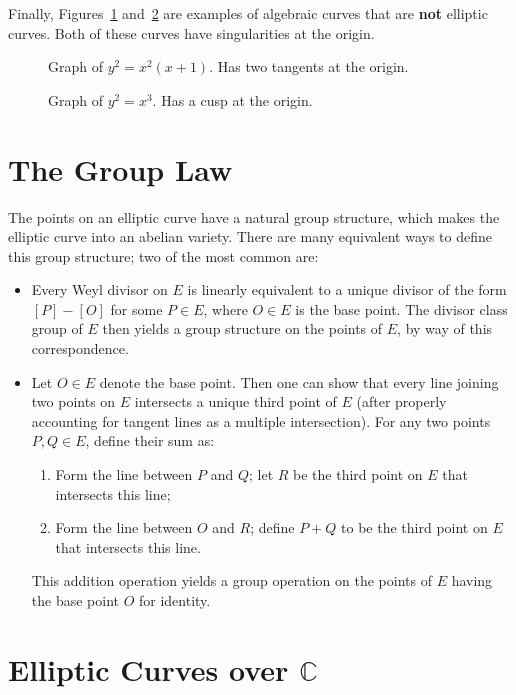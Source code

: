 \documentclass{article}
\theoremstyle{definition}
\begin{document}
Finally, Figures~\ref{001} and~\ref{000} are examples of algebraic curves that are {\bf not} elliptic curves. Both of these curves have singularities at the origin.
\begin{figure}
\caption{Graph of $y^2 = x^2 (x+1)$. Has two tangents at the origin.}
\label{001}
\end{figure}

\begin{figure}
\caption{Graph of $y^2 = x^3$. Has a cusp at the origin.}
\label{000}
\end{figure}

\section{The Group Law}

The points on an elliptic curve have a natural group structure, which makes the elliptic curve into an abelian variety. There are many equivalent ways to define this group structure; two of the most common are:
\begin{itemize}
\item Every Weyl divisor on $E$ is linearly equivalent to a unique divisor of the form $[P] - [O]$ for some $P \in E$, where $O \in E$ is the base point. The divisor class group of $E$ then yields a group structure on the points of $E$, by way of this correspondence.
\item Let $O \in E$ denote the base point. Then one can show that every line joining two points on $E$ intersects a unique third point of $E$ (after properly accounting for tangent lines as a multiple intersection). For any two points $P,Q \in E$, define their sum as:
\begin{enumerate}
\item Form the line between $P$ and $Q$; let $R$ be the third point on $E$ that intersects this line;
\item Form the line between $O$ and $R$; define $P+Q$ to be the third point on $E$ that intersects this line.
\end{enumerate}
This addition operation yields a group operation on the points of $E$ having the base point $O$ for identity.
\end{itemize}

\section{Elliptic Curves over $\mathbb{C}$}
\end{document}
